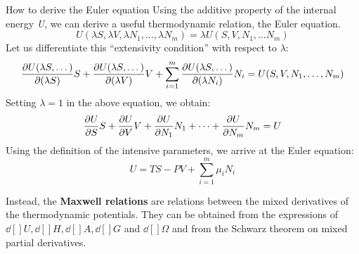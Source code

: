 \documentclass[../main/main.tex]{subfiles}
\begin{document}
\begin{example}{How to derive the Euler equation}{}
Using the additive property of the internal energy \emph{U}, we can derive a useful thermodynamic relation, the Euler equation.
\begin{equation*}
  U (\lambda S, \lambda V, \lambda N_1, \dots, \lambda N_m) = \lambda U (S,V,N_1,\dots N_m)
\end{equation*}
Let us differentiate this “extensivity condition” with respect to \( \lambda  \):
\begin{equation*}
\pdv{U (\lambda S, \dots)}{(\lambda S)} S + \pdv{U (\lambda S, \dots)}{(\lambda V)} V
+ \sum_{i = 1}^{m}  \pdv{U (\lambda S, \dots)}{(\lambda N_i)} N_i =
U (S,V,N_1,\dots,N_m)
\end{equation*}
Setting \( \lambda =1 \)  in the above equation, we obtain:
\begin{equation*}
  \pdv{U}{S} S + \pdv{U}{V} V + \pdv{U}{N_1}N_1 + \dots + \pdv{U}{N_m} N_m = U
\end{equation*}
Using the definition of the intensive parameters, we arrive at the Euler equation:
\begin{equation*}
  U = T S - P V + \sum_{i=1}^{m} \mu _i N_i
\end{equation*}
\end{example}


Instead, the \textbf{Maxwell relations} are relations between the mixed derivatives of the thermodynamic potentials. They can be obtained from the expressions of \( \dd[]{U},\dd[]{H} ,\dd[]{A}, \dd[]{G}    \)  and \( \dd[]{\Omega }  \) and from the Schwarz theorem on mixed partial derivatives.
\end{document}
